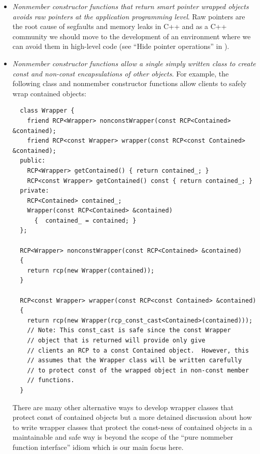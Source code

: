 \documentclass[pdf,ps2pdf,11pt]{SANDreport}
\begin{document}
\begin{itemize}

{}\item\textit{Nonmember constructor functions that return smart pointer
wrapped objects avoids raw pointers at the application programming level}.
Raw pointers are the root cause of segfaults and memory leaks in C++ and as a
C++ community we should move to the development of an environment where we can
avoid them in high-level code (see ``Hide pointer operations'' in
{}\cite[Section 7.1]{CodeComplete2nd04}).

{}\item\textit{Nonmember constructor functions allow a single simply written
class to create const and non-const encapsulations of other objects}.  For
example, the following class and nonmember constructor functions allow clients
to safely wrap contained objects:

{\small\begin{verbatim}
  class Wrapper {
    friend RCP<Wrapper> nonconstWrapper(const RCP<Contained> &contained);
    friend RCP<const Wrapper> wrapper(const RCP<const Contained> &contained);
  public:
    RCP<Wrapper> getContained() { return contained_; }
    RCP<const Wrapper> getContained() const { return contained_; }
  private:
    RCP<Contained> contained_;
    Wrapper(const RCP<Contained> &contained)
      {  contained_ = contained; }
  };

  RCP<Wrapper> nonconstWrapper(const RCP<Contained> &contained)
  {
    return rcp(new Wrapper(contained));
  }

  RCP<const Wrapper> wrapper(const RCP<const Contained> &contained)
  {
    return rcp(new Wrapper(rcp_const_cast<Contained>(contained)));
    // Note: This const_cast is safe since the const Wrapper
    // object that is returned will provide only give
    // clients an RCP to a const Contained object.  However, this
    // assumes that the Wrapper class will be written carefully
    // to protect const of the wrapped object in non-const member
    // functions.
  }

\end{verbatim}}

There are many other alternative ways to develop wrapper classes that protect
const of contained objects but a more detained discussion about how to write
wrapper classes that protect the const-ness of contained objects in a
maintainable and safe way is beyond the scope of the ``pure nommeber function
interface'' idiom which is our main focus here.

\end{itemize}
\end{document}
